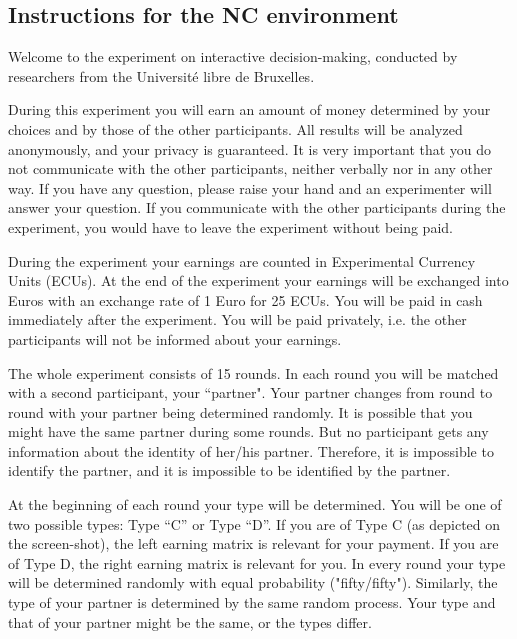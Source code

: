 \documentclass[12pt]{article}
\theoremstyle{break}
\begin{document}
\subsection{Instructions for the NC environment}

Welcome to the experiment on interactive decision-making, conducted by researchers from the Universit\'e libre de Bruxelles.

During this experiment you will earn an amount of money determined by your choices and by those of the other participants. All results will be analyzed anonymously, and your privacy is guaranteed. It is very important that you do not communicate with the other participants, neither verbally nor in any other way. If you have any question, please raise your hand and an experimenter will answer your question. If you communicate with the other participants during the experiment, you would have to leave the experiment without being paid. 

During the experiment your earnings are counted in Experimental Currency Units (ECUs). At the end of the experiment your earnings will be exchanged into Euros with an exchange rate of 1 Euro for 25 ECUs. You will be paid in cash immediately after the experiment. You will be paid privately, i.e. the other participants will not be informed about your earnings.

The whole experiment consists of 15 rounds. In each round you will be matched with a second participant, your ``partner". Your partner changes from round to round with your partner being determined randomly. It is possible that you might have the same partner during some rounds. But no participant gets any information about the identity of her/his partner. Therefore, it is impossible to identify the partner, and it is impossible to be identified by the partner.

At the beginning of each round your type will be determined. You will be one of two possible types: Type “C” or Type “D”. If you are of Type C (as depicted on the screen-shot), the left earning matrix is relevant for your payment. If you are of Type D, the right earning matrix is relevant for you. In every round your type will be determined randomly with equal probability ("fifty/fifty"). Similarly, the type of your partner is determined by the same random process. Your type and that of your partner might be the same, or the types differ.
 
\end{document}
